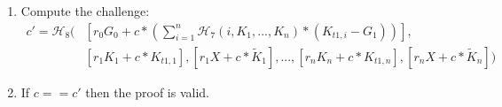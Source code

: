 \begin{appendices}
\begin{enumerate}
    \item Compute the challenge:
    \begin{align*}
        c' = \mathcal{H}_8(&[r_0 G_0 + c*(\sum^n_{i=1} \mathcal{H}_7(i, K_1,...,K_n)*(K_{t1,i} - G_1))],\\
        &[r_1 K_1 + c*K_{t1,1}], [r_1 X + c*\tilde{K}_1],...,[r_n K_n + c*K_{t1,n}], [r_n X + c*\tilde{K}_n])
    \end{align*}
    \[\]

    \item If $c == c'$ then the proof is valid.
\end{enumerate}


\end{appendices}